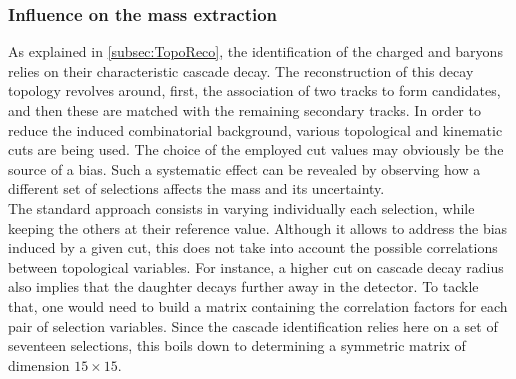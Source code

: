 \subsubsection{Influence on the mass extraction}
\label{subsubsec:SystTopoMass}

As explained in \Sec\ref{subsec:TopoReco}, the identification of the charged \rmXi and \rmOmega baryons relies on their characteristic cascade decay. The reconstruction of this decay topology revolves around, first, the association of two tracks to form \rmLambda candidates, and then these are matched with the remaining secondary tracks. In order to reduce the induced combinatorial background, various topological and kinematic cuts are being used. The choice of the employed cut values may obviously be the source of a bias. Such a systematic effect can be revealed by observing how a different set of selections affects the mass and its uncertainty.\\

The standard approach consists in varying individually each selection, while keeping the others at their reference value. Although it allows to address the bias induced by a given cut, this does not take into account the possible correlations between topological variables. For instance, a higher cut on cascade decay radius also implies that the \rmLambda daughter decays further away in the detector. To tackle that, one would need to build a matrix containing the correlation factors for each pair of selection variables. Since the cascade identification relies here on a set of seventeen selections, this boils down to determining a symmetric matrix of dimension $15 \times 15$.

